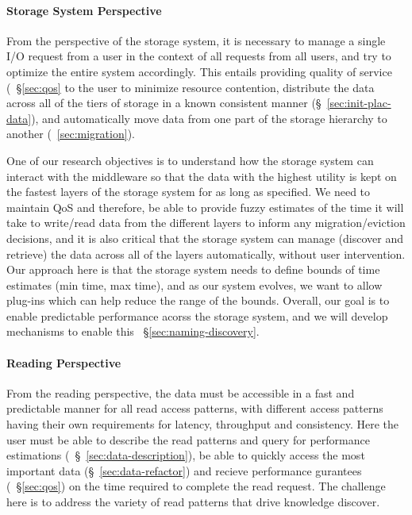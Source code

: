 \paragraph{Storage System Perspective}
\label{subsec:storage-perspective}
From the perspective of the storage system, it is necessary to manage a
single I/O request from a user in the context of all requests from all
users, and try to optimize the entire system accordingly. This entails
providing quality of service (~\S\ref{sec:qos} to the user to minimize
resource contention, distribute the data across all of the tiers of storage
in a known consistent manner (\S~\ref{sec:init-plac-data}), and automatically move data from one part of
the storage hierarchy to another (~\ref{sec:migration}). 

One of our research objectives is to understand how the
storage system can interact with the middleware   so
that the data with the highest utility is kept on the fastest layers of the
storage system for as long as specified. We need to maintain 
QoS and therefore, be able to provide fuzzy estimates of the time it will take to write/read data from
the different layers to inform any migration/eviction decisions, and it
is also critical that the storage system can manage (discover and retrieve) the data across all of the
layers automatically, without user intervention. 
Our approach here is that the storage system needs to define bounds of time estimates
(min time, max time), and as our system evolves, we want to allow plug-ins which can help
reduce the range of the bounds.
Overall, our goal is to enable predictable performance acorss the storage system, and we will develop mechanisms to enable this
~\S\ref{sec:naming-discovery}.



\paragraph{Reading  Perspective}
\label{subsec:reading-perspective}

From the reading perspective, the data must be accessible in a fast and
predictable manner for all read access patterns, with different access
patterns having their own requirements for latency, throughput and
consistency. Here the user must be able to describe the read patterns and
query for performance estimations (~\S~\ref{sec:data-description}), be able
to quickly access the most important data (\S~\ref{sec:data-refactor}) and recieve
performance gurantees (~\S\ref{sec:qos}) on the time required to complete
the read request. The challenge here is to address the variety of read
patterns that drive knowledge discover. 

